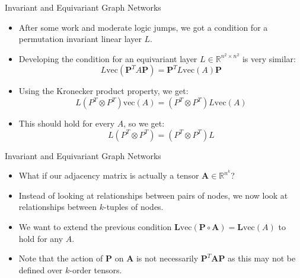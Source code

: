 \documentclass{beamer}
\begin{document}
\begin{frame}{Invariant and Equivariant Graph Networks}
    \begin{itemize}
        \setlength{\itemsep}{\fill}
        \item After some work and moderate logic jumps, we got a condition for a permutation invariant linear layer $L$.
        \item Developing the condition for an equivariant layer $L \in \mathbb{R}^{n^2 \times n^2}$ is very similar:
        \[ L\text{vec}(\boldsymbol{P}^T A\boldsymbol{P}) =\boldsymbol{P}^T L\text{vec}(A) \boldsymbol{P}\]
        \item Using the Kronecker product property, we get:
        \[ L(P^T\otimes P^T)\text{vec}(A) = (P^T\otimes P^T)L\text{vec}(A) \]
        \item This should hold for every $A$, so we get:
        \[ L(P^T\otimes P^T) = (P^T\otimes P^T)L \]
    \end{itemize}
\end{frame}
\begin{frame}{Invariant and Equivariant Graph Networks}
    \begin{itemize}
        \setlength{\itemsep}{\fill}
        \item What if our adjacency matrix is actually a tensor $\mathbf{A} \in \mathbb{R}^{n^k}$?
        \item Instead of looking at relationships between pairs of nodes, we now look at relationships between $k$-tuples of nodes.
        \item We want to extend the previous condition \(\mathbf{L}\text{vec}(\boldsymbol{P} \circ \mathbf{A}) = \mathbf{L}\text{vec}(A)\) to hold for any $A$.
        \item Note that the action of $\boldsymbol{P}$ on $\mathbf{A}$ is not necessarily $\boldsymbol{P}^T \mathbf{A} \boldsymbol{P}$ as this may not be defined over $k$-order tensors. 
    \end{itemize}
\end{frame}
\end{document}
